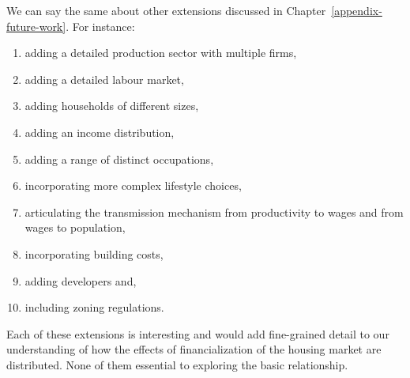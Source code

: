 We can say the same about other extensions discussed in Chapter~\ref{appendix-future-work}. For instance: 
\begin{enumerate}
    \item adding a detailed production sector with multiple firms,
    \item adding a detailed labour market,
    \item adding households of different sizes,
    \item adding an income distribution,
    \item adding a range of distinct occupations,
    \item incorporating more complex lifestyle choices,
    \item articulating the transmission mechanism from productivity to wages and from wages to population,
    \item incorporating building costs, 
    \item adding developers and,
    \item including zoning regulations. 
\end{enumerate}

Each of these extensions is interesting and would add fine-grained detail to our understanding of how the effects of financialization of the housing market are distributed. None of them essential to exploring the basic relationship. %







